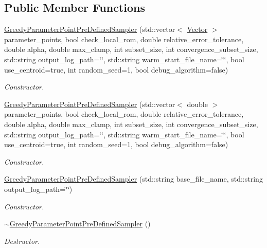 \subsection*{Public Member Functions}
\begin{DoxyCompactItemize}
\item 
\hyperlink{class_c_a_r_o_m_1_1_greedy_parameter_point_pre_defined_sampler_aa7fc81a5faa35358fb98d2d8b0c55266}{Greedy\-Parameter\-Point\-Pre\-Defined\-Sampler} (std\-::vector$<$ \hyperlink{class_c_a_r_o_m_1_1_vector}{Vector} $>$ parameter\-\_\-points, bool check\-\_\-local\-\_\-rom, double relative\-\_\-error\-\_\-tolerance, double alpha, double max\-\_\-clamp, int subset\-\_\-size, int convergence\-\_\-subset\-\_\-size, std\-::string output\-\_\-log\-\_\-path=\char`\"{}\char`\"{}, std\-::string warm\-\_\-start\-\_\-file\-\_\-name=\char`\"{}\char`\"{}, bool use\-\_\-centroid=true, int random\-\_\-seed=1, bool debug\-\_\-algorithm=false)
\begin{DoxyCompactList}\small\item\em Constructor. \end{DoxyCompactList}\item 
\hyperlink{class_c_a_r_o_m_1_1_greedy_parameter_point_pre_defined_sampler_a0508e37506741255ea63e18693afd71e}{Greedy\-Parameter\-Point\-Pre\-Defined\-Sampler} (std\-::vector$<$ double $>$ parameter\-\_\-points, bool check\-\_\-local\-\_\-rom, double relative\-\_\-error\-\_\-tolerance, double alpha, double max\-\_\-clamp, int subset\-\_\-size, int convergence\-\_\-subset\-\_\-size, std\-::string output\-\_\-log\-\_\-path=\char`\"{}\char`\"{}, std\-::string warm\-\_\-start\-\_\-file\-\_\-name=\char`\"{}\char`\"{}, bool use\-\_\-centroid=true, int random\-\_\-seed=1, bool debug\-\_\-algorithm=false)
\begin{DoxyCompactList}\small\item\em Constructor. \end{DoxyCompactList}\item 
\hyperlink{class_c_a_r_o_m_1_1_greedy_parameter_point_pre_defined_sampler_a2b8bc3f172c00273d11a503af4bb53c5}{Greedy\-Parameter\-Point\-Pre\-Defined\-Sampler} (std\-::string base\-\_\-file\-\_\-name, std\-::string output\-\_\-log\-\_\-path=\char`\"{}\char`\"{})
\begin{DoxyCompactList}\small\item\em Constructor. \end{DoxyCompactList}\item 
\hypertarget{class_c_a_r_o_m_1_1_greedy_parameter_point_pre_defined_sampler_ac92a151af6f2c319040425bc698a48a7}{\hyperlink{class_c_a_r_o_m_1_1_greedy_parameter_point_pre_defined_sampler_ac92a151af6f2c319040425bc698a48a7}{$\sim$\-Greedy\-Parameter\-Point\-Pre\-Defined\-Sampler} ()}\label{class_c_a_r_o_m_1_1_greedy_parameter_point_pre_defined_sampler_ac92a151af6f2c319040425bc698a48a7}

\begin{DoxyCompactList}\small\item\em Destructor. \end{DoxyCompactList}\end{DoxyCompactItemize}
